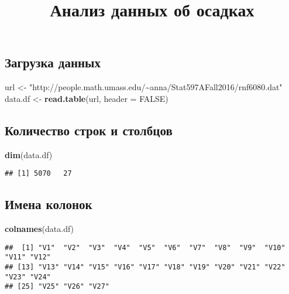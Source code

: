 \documentclass[
]{article}
\title{Анализ данных об осадках}
\author{}
\date{\vspace{-2.5em}}
\newenvironment{Shaded}{\begin{snugshade}}{\end{snugshade}}
\newcommand{\AttributeTok}[1]{\textcolor[rgb]{0.13,0.29,0.53}{#1}}
\newcommand{\ConstantTok}[1]{\textcolor[rgb]{0.56,0.35,0.01}{#1}}
\newcommand{\FunctionTok}[1]{\textcolor[rgb]{0.13,0.29,0.53}{\textbf{#1}}}
\newcommand{\NormalTok}[1]{#1}
\newcommand{\OtherTok}[1]{\textcolor[rgb]{0.56,0.35,0.01}{#1}}
\newcommand{\StringTok}[1]{\textcolor[rgb]{0.31,0.60,0.02}{#1}}
\begin{document}
\maketitle

\subsection{Загрузка
данных}\label{ux437ux430ux433ux440ux443ux437ux43aux430-ux434ux430ux43dux43dux44bux445}

\begin{Shaded}
\begin{Highlighting}[]
\NormalTok{url }\OtherTok{\textless{}{-}} \StringTok{"http://people.math.umass.edu/\textasciitilde{}anna/Stat597AFall2016/rnf6080.dat"}
\NormalTok{data.df }\OtherTok{\textless{}{-}} \FunctionTok{read.table}\NormalTok{(url, }\AttributeTok{header =} \ConstantTok{FALSE}\NormalTok{)}
\end{Highlighting}
\end{Shaded}

\subsection{Количество строк и
столбцов}\label{ux43aux43eux43bux438ux447ux435ux441ux442ux432ux43e-ux441ux442ux440ux43eux43a-ux438-ux441ux442ux43eux43bux431ux446ux43eux432}

\begin{Shaded}
\begin{Highlighting}[]
\FunctionTok{dim}\NormalTok{(data.df)}
\end{Highlighting}
\end{Shaded}

\begin{verbatim}
## [1] 5070   27
\end{verbatim}

\subsection{Имена
колонок}\label{ux438ux43cux435ux43dux430-ux43aux43eux43bux43eux43dux43eux43a}

\begin{Shaded}
\begin{Highlighting}[]
\FunctionTok{colnames}\NormalTok{(data.df)}
\end{Highlighting}
\end{Shaded}

\begin{verbatim}
##  [1] "V1"  "V2"  "V3"  "V4"  "V5"  "V6"  "V7"  "V8"  "V9"  "V10" "V11" "V12"
## [13] "V13" "V14" "V15" "V16" "V17" "V18" "V19" "V20" "V21" "V22" "V23" "V24"
## [25] "V25" "V26" "V27"
\end{verbatim}
\end{document}
